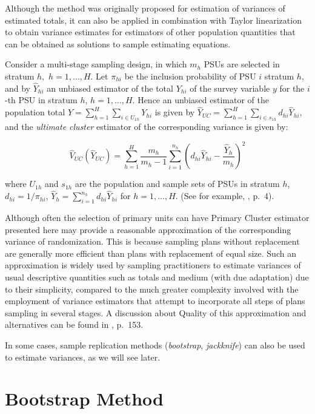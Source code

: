 \documentclass[
  12pt,
]{book}
\begin{document}
Although the method was originally proposed for estimation of variances of estimated totals, it can also be applied in combination with Taylor linearization to obtain variance estimates for estimators of other population quantities that can be obtained as solutions to sample estimating equations.

Consider a multi-stage sampling design, in which \(m_{h}\) PSUs are selected in stratum \(h,\) \(h=1,\ldots ,H\). Let \(\pi_{hi}\) be the inclusion probability of PSU \(i\) stratum \(h\), and by \(\widehat{Y}_{hi}\) an unbiased estimator of the total \(Y_{hi}\) of the survey variable \(y\) for the \(i\)-th PSU in stratum \(h\), \(h=1,\ldots ,H\). Hence an unbiased estimator of the population total \(Y = \sum_{h=1}^{H} \sum_{i \in U_{1h}} Y_{hi}\) is given by \(\widehat{Y}_{UC} = \sum_{h=1}^{H} \sum_{i \in s_{1h}} d_{hi} \widehat{Y}_{hi}\), and the \emph{ultimate cluster} estimator of the corresponding variance is given by:

\[
\widehat{V}_{UC} \left( \widehat{Y}_{UC}\right) = \sum_{h=1}^{H} \frac{m_{h}}
{m_{h}-1} \sum_{i=1}^{n_{h}} \left( d_{hi} \widehat{Y}_{hi} - \frac{\widehat{Y}_{h}}{m_{h}} \right) ^{2}
\]

where \(U_{1h}\) and \(s_{1h}\) are the population and sample sets of PSUs in stratum \(h\), \(d_{hi} = 1 / \pi_{hi}\), \(\widehat{Y}_{h} = \sum_{i=1}^{n_{h}} d_{hi} \widehat{Y}_{hi}\) for \(h=1,\ldots ,H\). (See for example, \citep{Shah1993}, p.~4).

Although often the selection of primary units can have Primary Cluster estimator presented here may provide a reasonable approximation of the corresponding variance of randomization. This is because sampling plans without replacement are generally more efficient than plans with replacement of equal size. Such an approximation is widely used by sampling practitioners to estimate variances of usual descriptive quantities such as totals and medium (with due adaptation) due to their simplicity, compared to the much greater complexity involved with the employment of variance estimators that attempt to incorporate all steps of plans sampling in several stages. A discussion about Quality of this approximation and alternatives can be found in \citep{SSW92}, p.~153.

In some cases, sample replication methods (\emph{bootstrap}, \emph{jackknife}) can also be used to estimate variances, as we will see later.

\hypertarget{bootstrap-method}{%
\section{Bootstrap Method}\label{bootstrap-method}}
\end{document}
